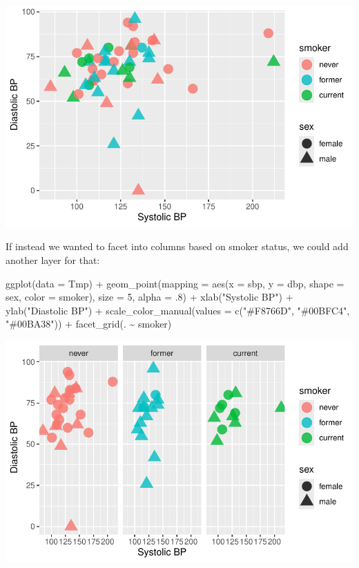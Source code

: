 \documentclass[
  letterpaper,
  DIV=11,
  numbers=noendperiod]{scrreprt}
\newenvironment{Shaded}{\begin{snugshade}}{\end{snugshade}}
\newcommand{\AttributeTok}[1]{\textcolor[rgb]{0.40,0.45,0.13}{#1}}
\newcommand{\DecValTok}[1]{\textcolor[rgb]{0.68,0.00,0.00}{#1}}
\newcommand{\FunctionTok}[1]{\textcolor[rgb]{0.28,0.35,0.67}{#1}}
\newcommand{\NormalTok}[1]{\textcolor[rgb]{0.00,0.23,0.31}{#1}}
\newcommand{\SpecialCharTok}[1]{\textcolor[rgb]{0.37,0.37,0.37}{#1}}
\newcommand{\StringTok}[1]{\textcolor[rgb]{0.13,0.47,0.30}{#1}}
\begin{document}
\includegraphics{src/02-Intro_Data_Viz_files/figure-pdf/unnamed-chunk-7-1.pdf}

If instead we wanted to facet into columns based on smoker status, we
could add another layer for that:

\begin{Shaded}
\begin{Highlighting}[]
\FunctionTok{ggplot}\NormalTok{(}\AttributeTok{data =}\NormalTok{ Tmp) }\SpecialCharTok{+}
  \FunctionTok{geom\_point}\NormalTok{(}\AttributeTok{mapping =} \FunctionTok{aes}\NormalTok{(}\AttributeTok{x =}\NormalTok{ sbp, }\AttributeTok{y =}\NormalTok{ dbp, }\AttributeTok{shape =}\NormalTok{ sex, }\AttributeTok{color =}\NormalTok{ smoker), }\AttributeTok{size =} \DecValTok{5}\NormalTok{, }\AttributeTok{alpha =}\NormalTok{ .}\DecValTok{8}\NormalTok{) }\SpecialCharTok{+}
  \FunctionTok{xlab}\NormalTok{(}\StringTok{"Systolic BP"}\NormalTok{) }\SpecialCharTok{+} \FunctionTok{ylab}\NormalTok{(}\StringTok{"Diastolic BP"}\NormalTok{) }\SpecialCharTok{+}
  \FunctionTok{scale\_color\_manual}\NormalTok{(}\AttributeTok{values =} \FunctionTok{c}\NormalTok{(}\StringTok{"\#F8766D"}\NormalTok{, }\StringTok{"\#00BFC4"}\NormalTok{, }\StringTok{"\#00BA38"}\NormalTok{)) }\SpecialCharTok{+}
  \FunctionTok{facet\_grid}\NormalTok{(. }\SpecialCharTok{\textasciitilde{}}\NormalTok{ smoker)}
\end{Highlighting}
\end{Shaded}

\includegraphics{src/02-Intro_Data_Viz_files/figure-pdf/unnamed-chunk-8-1.pdf}
\end{document}
